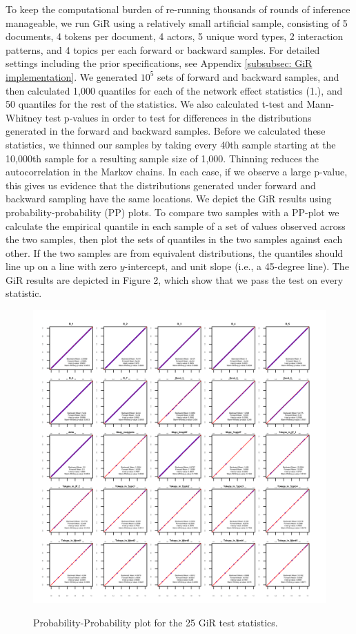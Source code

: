 \documentclass[a4paper]{article}
\begin{document}
To keep the computational burden of re-running thousands of rounds of inference manageable, we run GiR using a relatively small artificial sample, consisting of 5 documents, 4 tokens per document, 4 actors, 5 unique word types, 2 interaction patterns, and 4 topics per each forward or backward samples. For detailed settings including the prior specifications, see Appendix \ref{subsubsec: GiR implementation}. 
We generated $10^5$ sets of forward and backward samples, and then calculated 1,000 quantiles for each of the network effect statistics (1.), and 50 quantiles for the rest of the statistics. We also calculated t-test and Mann-Whitney test p-values in order to test for differences in the distributions generated in the forward and backward samples. Before we calculated these statistics, we thinned our samples 
by taking every 40th sample starting at the 10,000th sample for a resulting sample size of 1,000. Thinning reduces the autocorrelation in the Markov chains. In each case, if we observe a large p-value, this gives us evidence that the distributions generated under forward and backward sampling have the same locations. We depict the GiR results using probability-probability (PP) plots. To compare two samples with a PP-plot we calculate the empirical quantile in each sample of a set of values observed across the two samples, then plot the sets of quantiles in the two samples against each other. If the two samples are from equivalent distributions, the quantiles should line up on a line with zero $y$-intercept, and unit slope (i.e., a 45-degree line). The GiR results are depicted in Figure 2, which show that we pass the test on every statistic.
\begin{figure}[ht]
	\centering
	\includegraphics[width=1\textwidth]{plots/Schein.png} 
	\label{fig:PPplot_noC}
	\caption{Probability-Probability plot for the 25 GiR test statistics.}
\end{figure}
\end{document}
